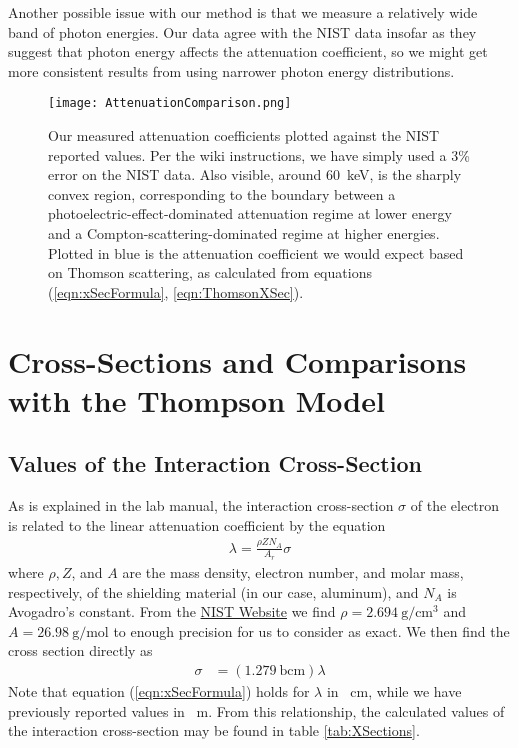 \documentclass[letter]{article}
\begin{document}
Another possible issue with our method is that we measure a relatively wide band of photon energies. Our data agree with the NIST data insofar as they suggest that photon energy affects the attenuation coefficient, so we might get more consistent results from using narrower photon energy distributions.

\begin{figure}[h] \centering
    \texttt{[image: AttenuationComparison.png]}
    \caption{Our measured attenuation coefficients plotted against the NIST reported values. Per the wiki instructions, we have simply used a 3\% error on the NIST data. Also visible, around \qty{60}{\kilo\electronvolt}, is the sharply convex region, corresponding to the boundary between a photoelectric-effect-dominated attenuation regime at lower energy and a Compton-scattering-dominated regime at higher energies. Plotted in blue is the attenuation coefficient we would expect based on Thomson scattering, as calculated from equations (\ref{eqn:xSecFormula}, \ref{eqn:ThomsonXSec}).}
    \label{fig:AttenComp}
\end{figure}


\section{Cross-Sections and Comparisons with the Thompson Model}

\subsection{Values of the Interaction Cross-Section}

As is explained in the lab manual, the interaction cross-section $\sigma$ of the electron is related to the linear attenuation coefficient by the equation
\begin{align}
\lambda = \frac{\rho Z N_A}{A_r} \sigma
\end{align}
where $\rho, Z$, and $A$ are the mass density, electron number, and molar mass, respectively, of the shielding material (in our case, aluminum), and $N_A$ is Avogadro's constant. From the \href{https://physics.nist.gov/cgi-bin/ffast/ffast.pl?Formula=Al&gtype=0&lower=&upper=&density=}{NIST Website} we find $\rho = \qty{2.694}{\g\per\cm\cubed}$ and ${A = \qty{26.98}{\g\per\mol}}$ to enough precision for us to consider as exact. We then find the cross section directly as
\begin{align}
\sigma &= \left( \qty{1.279}{\barn\cm} \right)  \lambda  \label{eqn:xSecFormula}
\end{align} 
Note that equation (\ref{eqn:xSecFormula}) holds for $\lambda$ in \unit{\per\cm}, while we have previously reported values in \unit{\per\m}. From this relationship, the calculated values of the interaction cross-section may be found in table \ref{tab:XSections}.
\end{document}
